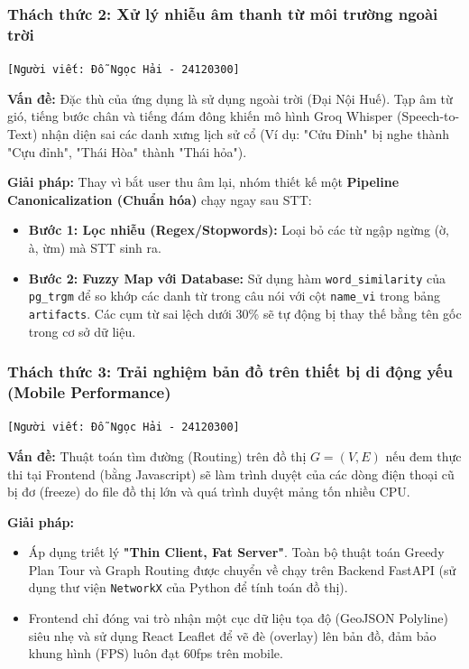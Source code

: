 \subsubsection{Thách thức 2: Xử lý nhiễu âm thanh từ môi trường ngoài trời}
\texttt{[Người viết: Đỗ Ngọc Hải - 24120300]}

\textbf{Vấn đề:}
Đặc thù của ứng dụng là sử dụng ngoài trời (Đại Nội Huế). Tạp âm từ gió, tiếng bước chân và tiếng đám đông khiến mô hình Groq Whisper (Speech-to-Text) nhận diện sai các danh xưng lịch sử cổ (Ví dụ: "Cửu Đỉnh" bị nghe thành "Cựu đỉnh", "Thái Hòa" thành "Thái hỏa").

\textbf{Giải pháp:}
Thay vì bắt user thu âm lại, nhóm thiết kế một \textbf{Pipeline Canonicalization (Chuẩn hóa)} chạy ngay sau STT:
\begin{itemize}
    \item \textbf{Bước 1: Lọc nhiễu (Regex/Stopwords):} Loại bỏ các từ ngập ngừng (ờ, à, ừm) mà STT sinh ra.
    \item \textbf{Bước 2: Fuzzy Map với Database:} Sử dụng hàm \texttt{word\_similarity} của \texttt{pg\_trgm} để so khớp các danh từ trong câu nói với cột \texttt{name\_vi} trong bảng \texttt{artifacts}. Các cụm từ sai lệch dưới 30\% sẽ tự động bị thay thế bằng tên gốc trong cơ sở dữ liệu.
\end{itemize}

\subsubsection{Thách thức 3: Trải nghiệm bản đồ trên thiết bị di động yếu (Mobile Performance)}
\texttt{[Người viết: Đỗ Ngọc Hải - 24120300]}

\textbf{Vấn đề:}
Thuật toán tìm đường (Routing) trên đồ thị $G=(V, E)$ nếu đem thực thi tại Frontend (bằng Javascript) sẽ làm trình duyệt của các dòng điện thoại cũ bị đơ (freeze) do file đồ thị lớn và quá trình duyệt mảng tốn nhiều CPU.

\textbf{Giải pháp:}
\begin{itemize}
    \item Áp dụng triết lý \textbf{"Thin Client, Fat Server"}. Toàn bộ thuật toán Greedy Plan Tour và Graph Routing được chuyển về chạy trên Backend FastAPI (sử dụng thư viện \texttt{NetworkX} của Python để tính toán đồ thị).
    \item Frontend chỉ đóng vai trò nhận một cục dữ liệu tọa độ (GeoJSON Polyline) siêu nhẹ và sử dụng React Leaflet để vẽ đè (overlay) lên bản đồ, đảm bảo khung hình (FPS) luôn đạt 60fps trên mobile.
\end{itemize}

